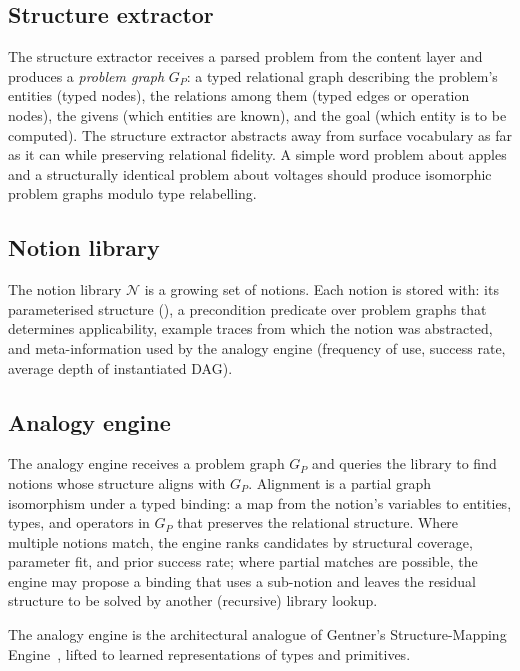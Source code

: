 \documentclass[11pt,a4paper]{article}
\theoremstyle{plain}
\theoremstyle{definition}
\theoremstyle{remark}
\newcommand{\Notions}{\mathcal{N}}
\begin{document}
\subsection{Structure extractor}

The structure extractor receives a parsed problem from the content layer and produces a \emph{problem graph} $G_P$: a typed relational graph describing the problem's entities (typed nodes), the relations among them (typed edges or operation nodes), the givens (which entities are known), and the goal (which entity is to be computed). The structure extractor abstracts away from surface vocabulary as far as it can while preserving relational fidelity. A simple word problem about apples and a structurally identical problem about voltages should produce isomorphic problem graphs modulo type relabelling.

\subsection{Notion library}

The notion library $\Notions$ is a growing set of notions. Each notion is stored with: its parameterised structure (), a precondition predicate over problem graphs that determines applicability, example traces from which the notion was abstracted, and meta-information used by the analogy engine (frequency of use, success rate, average depth of instantiated DAG).

\subsection{Analogy engine}

The analogy engine receives a problem graph $G_P$ and queries the library to find notions whose structure aligns with $G_P$. Alignment is a partial graph isomorphism under a typed binding: a map from the notion's variables to entities, types, and operators in $G_P$ that preserves the relational structure. Where multiple notions match, the engine ranks candidates by structural coverage, parameter fit, and prior success rate; where partial matches are possible, the engine may propose a binding that uses a sub-notion and leaves the residual structure to be solved by another (recursive) library lookup.

The analogy engine is the architectural analogue of Gentner's Structure-Mapping Engine~\cite{falkenhainer1989sme}, lifted to learned representations of types and primitives.
\end{document}
